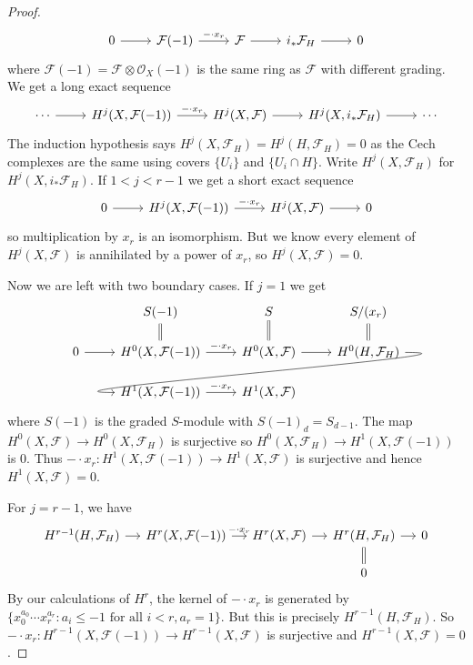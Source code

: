 \documentclass[a4paper]{article}
\newcommand{\sh}[1]{\mathcal{#1}} %
\begin{document}
\begin{proof}
  \[
    \begin{tikzcd}
      0 \ar[r] & \sh F(-1) \ar[r, "-\cdot x_r"] & \sh F \ar[r] & i_* \sh F_H \ar[r] & 0
    \end{tikzcd}
  \]
  where \(\sh F(-1) = \sh F \otimes \sh O_X(-1)\) is the same ring as \(\sh F\) with different grading. We get a long exact sequence
  \[
    \begin{tikzcd}
      \cdots \ar[r] & H^j(X, \sh F(-1)) \ar[r, "- \cdot x_r"] & H^j(X, \sh F) \ar[r] & H^j(X, i_* \sh F_H) \ar[r] & \cdots
    \end{tikzcd}
  \]
  The induction hypothesis says \(H^j(X, \sh F_H) = H^j(H, \sh F_H) = 0\) as the Cech complexes are the same using covers \(\{U_i\}\) and \(\{U_i \cap H\}\). Write \(H^j(X, \sh F_H)\) for \(H^j(X, i_* \sh F_H)\). If \(1 < j < r - 1\) we get a short exact sequence
  \[
    \begin{tikzcd}
      0 \ar[r] & H^j(X, \sh F(-1)) \ar[r, "- \cdot x_r"] & H^j(X, \sh F) \ar[r] & 0
    \end{tikzcd}
  \]
  so multiplication by \(x_r\) is an isomorphism. But we know every element of \(H^j(X, \sh F)\) is annihilated by a power of \(x_r\), so \(H^j(X, \sh F) = 0\).

  Now we are left with two boundary cases. If \(j = 1\) we get
  \[
    \begin{tikzcd}[row sep=scriptsize]
      & S(-1) \ar[d, equal] & S \ar[d, equal] & S/(x_r) \ar[d, equal] \\
      0 \ar[r] & H^0(X, \sh F(-1)) \ar[r, "- \cdot x_r"] & H^0(X, \sh F) \ar[r] & H^0(H, \sh F_H) \ar[dll, overlay, in=180, out=0] \\
      & H^1(X, \sh F(-1)) \ar[r, "- \cdot x_r"] & H^1(X, \sh F)
    \end{tikzcd}
  \]
  where \(S(-1)\) is the graded \(S\)-module with \(S(-1)_d = S_{d - 1}\). The map \(H^0(X, \sh F) \to H^0(X, \sh F_H)\) is surjective so \(H^0(X, \sh F_H) \to H^1(X, \sh F(-1))\) is \(0\). Thus \(- \cdot x_r: H^1(X, \sh F(-1)) \to H^1(X, \sh F)\) is surjective and hence \(H^1(X, \sh F) = 0\).

  For \(j = r - 1\), we have
  \[
    \begin{tikzcd}[row sep=scriptsize, column sep=small]
      H^{r - 1}(H, \sh F_H) \ar[r] & H^r(X, \sh F(-1)) \ar[r, "- \cdot x_r"] & H^r(X, \sh F) \ar[r] & H^r(H, \sh F_H) \ar[d, equal] \ar[r] & 0 \\
      & & & 0
    \end{tikzcd}
  \]
  By our calculations of \(H^r\), the kernel of \(- \cdot x_r\) is generated by \(\{x_0^{a_0} \cdots x_r^{a_r}: a_i \leq -1 \text{ for all } i < r, a_r = 1\}\). But this is precisely \(H^{r - 1}(H, \sh F_H)\). So \(- \cdot x_r: H^{r - 1}(X, \sh F(-1)) \to H^{r - 1}(X, \sh F)\) is surjective and \(H^{r - 1}(X, \sh F) = 0\).
\end{proof}
\end{document}
